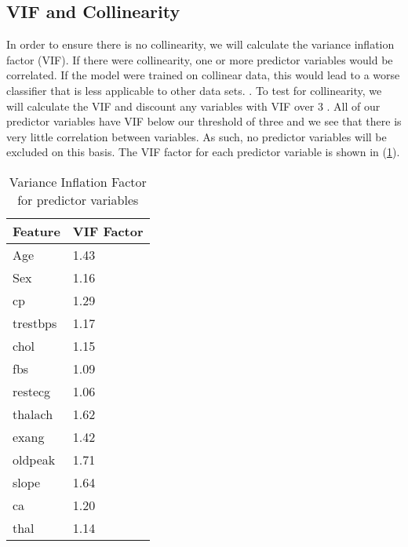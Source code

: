 \documentclass[letter]{article}
\begin{document}
\subsection{VIF and Collinearity}
In order to ensure there is no collinearity, we will calculate the variance inflation factor (VIF). If there were collinearity, 
one or more predictor variables would be correlated.  If the model were trained on collinear data, this would lead to a worse 
classifier that is less applicable to other data sets.  \citep{collinearity}.  To test for collinearity, we will calculate the 
VIF and discount any variables with VIF over \(3\) \citep{psu_vif}.  All of our predictor variables have VIF below our threshold 
of three and we see that there is very little correlation between variables.  As such, no predictor variables will be excluded on 
this basis.  The VIF factor for each predictor variable is shown in (\ref{tab:VIF_fac}).
\begin{table}[]
	\centering
	\begin{tabular}{@{}ll@{}}
		\toprule
		Feature  & VIF Factor \\ \midrule
		Age      & 1.43       \\
		Sex      & 1.16       \\
		cp       & 1.29       \\
		trestbps & 1.17       \\
		chol     & 1.15       \\
		fbs      & 1.09       \\
		restecg  & 1.06       \\
		thalach  & 1.62       \\
		exang    & 1.42       \\
		oldpeak  & 1.71       \\
		slope    & 1.64       \\
		ca       & 1.20       \\
		thal     & 1.14       \\ \bottomrule
	\end{tabular}
	\caption{Variance Inflation Factor for predictor variables}
	\label{tab:VIF_fac}
\end{table}

\end{document}
